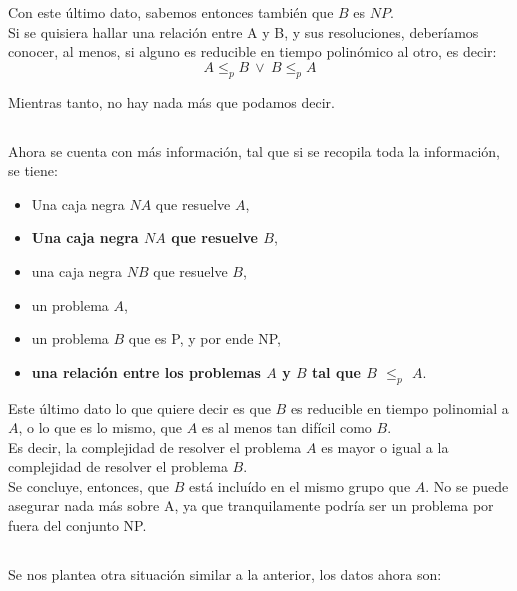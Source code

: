 Con este último dato, sabemos entonces también que $B$ es $NP$.\\

Si se quisiera hallar una relación entre A y B, y sus resoluciones, deberíamos conocer, al menos, si alguno es reducible en tiempo polinómico al otro, es decir:\\

\begin{equation*}
    A \leq_{p} B \ \vee \  B \leq_{p} A
\end{equation*}

Mientras tanto, no hay nada más que podamos decir.

\subsection{}

Ahora se cuenta con más información, tal que si se recopila toda la información, se tiene:\\

\begin{itemize}
    \item Una caja negra $NA$ que resuelve $A$,
    \item\textbf{Una caja negra $NA$ que resuelve $B$},
    \item una caja negra $NB$ que resuelve $B$,
    \item un problema $A$,
    \item un problema $B$ que es P, y por ende NP,
    \item \textbf{una relación entre los problemas $A$ y $B$ tal que $B$ $\leq_{p}$ $A$}.
\end{itemize}

Este último dato lo que quiere decir es que $B$ es reducible en tiempo polinomial a $A$, o lo que es lo mismo, que $A$ es al menos tan difícil como $B$.\\
Es decir, la complejidad de resolver el problema $A$ es mayor o igual a la complejidad de resolver el problema $B$.\\
Se concluye, entonces, que $B$ está incluído en el mismo grupo que $A$. No se puede asegurar nada más sobre A, ya que tranquilamente podría ser un problema por fuera del conjunto NP.\\

\subsection{}
Se nos plantea otra situación similar a la anterior, los datos ahora son:


